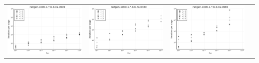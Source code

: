 \documentclass{article}
\begin{document}
\begin{landscape}
\begin{center}
\begin{longtable}{| c | c | c | c |}
                \hline
\includegraphics[height=0.22\textheight]{itepst_fixlim_netgen-1000-1-_-b-b-ns-0000.png} &
\includegraphics[height=0.22\textheight]{itepst_fixlim_netgen-1000-1-_-b-b-ns-0330.png} &
\includegraphics[height=0.22\textheight]{itepst_fixlim_netgen-1000-1-_-b-b-ns-0660.png} &

\end{longtable}
\end{center}
\end{landscape}
\end{document}
